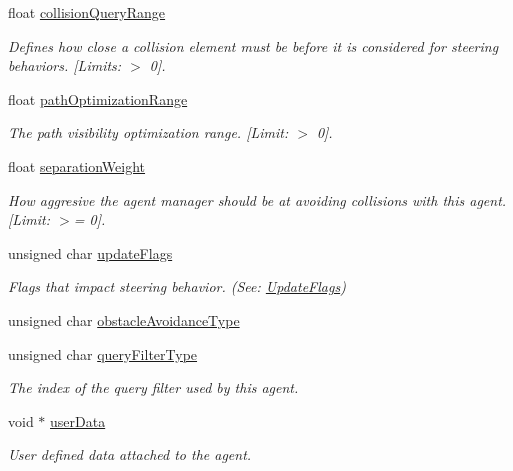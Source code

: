 \begin{DoxyCompactItemize}
float \hyperlink{structdtCrowdAgentParams_a5e1c7373b02e2f926360e3d3130be068}{collision\+Query\+Range}
\begin{DoxyCompactList}\small\item\em Defines how close a collision element must be before it is considered for steering behaviors. \mbox{[}Limits\+: $>$ 0\mbox{]}. \end{DoxyCompactList}\item 
float \hyperlink{structdtCrowdAgentParams_ab390e7ccafffda667a1132917ad91b93}{path\+Optimization\+Range}
\begin{DoxyCompactList}\small\item\em The path visibility optimization range. \mbox{[}Limit\+: $>$ 0\mbox{]}. \end{DoxyCompactList}\item 
float \hyperlink{structdtCrowdAgentParams_a616534204934492b4f3bc7eb2ff49a0b}{separation\+Weight}
\begin{DoxyCompactList}\small\item\em How aggresive the agent manager should be at avoiding collisions with this agent. \mbox{[}Limit\+: $>$= 0\mbox{]}. \end{DoxyCompactList}\item 
\mbox{\label{structdtCrowdAgentParams_a7066a4477bbfa53fc1c983e17aa3e5ae}} 
unsigned char \hyperlink{structdtCrowdAgentParams_a7066a4477bbfa53fc1c983e17aa3e5ae}{update\+Flags}
\begin{DoxyCompactList}\small\item\em Flags that impact steering behavior. (See\+: \hyperlink{group__crowd_gaa94b67d2fdcc390690c523f28019e52f}{Update\+Flags}) \end{DoxyCompactList}\item 
unsigned char \hyperlink{structdtCrowdAgentParams_ae8be062f1d9616d17d8b536f7a501498}{obstacle\+Avoidance\+Type}
\item 
\mbox{\label{structdtCrowdAgentParams_af5d15cba10237592b1766d7d82da1420}} 
unsigned char \hyperlink{structdtCrowdAgentParams_af5d15cba10237592b1766d7d82da1420}{query\+Filter\+Type}
\begin{DoxyCompactList}\small\item\em The index of the query filter used by this agent. \end{DoxyCompactList}\item 
\mbox{\label{structdtCrowdAgentParams_a105cb3e3773b32e4973b45671291385f}} 
void $\ast$ \hyperlink{structdtCrowdAgentParams_a105cb3e3773b32e4973b45671291385f}{user\+Data}
\begin{DoxyCompactList}\small\item\em User defined data attached to the agent. \end{DoxyCompactList}\end{DoxyCompactItemize}


